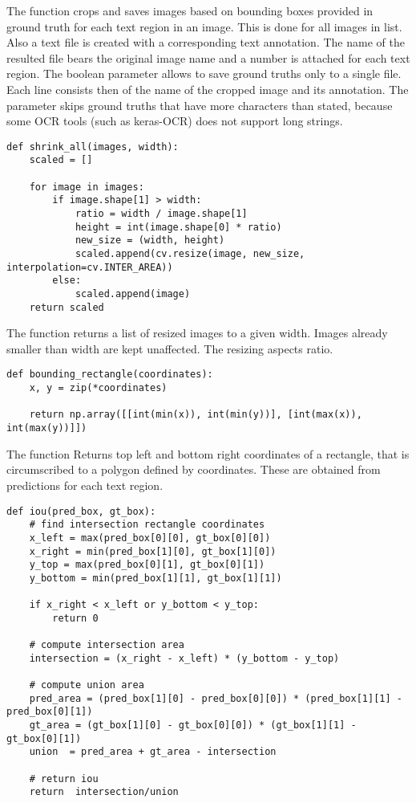 The function  crops and saves images based on bounding boxes provided in ground truth for each text region in an image. This is done for all images in  list. Also a text file is created with a corresponding text annotation. The name of the resulted file bears the original image name and a number is attached for each text region. The boolean parameter  allows to save ground truths only to a single file. Each line consists then of the name of the cropped image and its annotation. The parameter  skips ground truths that have more characters than stated, because some OCR tools (such as keras-OCR) does not support long strings.

\begin{lstlisting}[caption=shrink\_all]
def shrink_all(images, width):
    scaled = []
    
    for image in images:
        if image.shape[1] > width:
            ratio = width / image.shape[1]
            height = int(image.shape[0] * ratio)
            new_size = (width, height)  
            scaled.append(cv.resize(image, new_size, interpolation=cv.INTER_AREA))
        else:
            scaled.append(image)
    return scaled    
\end{lstlisting}

The function  returns a list of resized images to a given width. Images already smaller than width are kept unaffected. The resizing aspects ratio.

\begin{lstlisting}[caption=bounding\_rectangle]
def bounding_rectangle(coordinates):
    x, y = zip(*coordinates)

    return np.array([[int(min(x)), int(min(y))], [int(max(x)), int(max(y))]])
\end{lstlisting}

The function 
Returns top left and bottom right coordinates of a rectangle, that is circumscribed to a polygon defined by coordinates. These are obtained from predictions for each text region.


\begin{lstlisting}[caption=iou]
def iou(pred_box, gt_box):
    # find intersection rectangle coordinates
    x_left = max(pred_box[0][0], gt_box[0][0])
    x_right = min(pred_box[1][0], gt_box[1][0])
    y_top = max(pred_box[0][1], gt_box[0][1])
    y_bottom = min(pred_box[1][1], gt_box[1][1])

    if x_right < x_left or y_bottom < y_top:
        return 0
    
    # compute intersection area
    intersection = (x_right - x_left) * (y_bottom - y_top)

    # compute union area
    pred_area = (pred_box[1][0] - pred_box[0][0]) * (pred_box[1][1] - pred_box[0][1]) 
    gt_area = (gt_box[1][0] - gt_box[0][0]) * (gt_box[1][1] - gt_box[0][1]) 
    union  = pred_area + gt_area - intersection

    # return iou
    return  intersection/union

\end{lstlisting}

